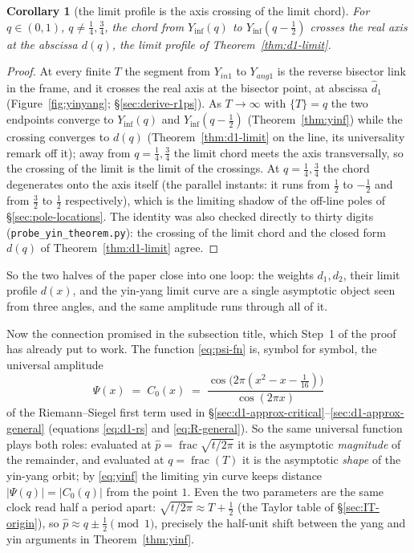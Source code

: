 \documentclass[11pt]{article}
\newtheorem{corollary}[theorem]{Corollary}
\theoremstyle{definition}
\begin{document}
\begin{corollary}[the limit profile is the axis crossing of the limit
chord]\label{cor:yinf-crossing}
For $q\in(0,1)$, $q\neq\tfrac14,\tfrac34$, the chord from
$Y_{\inf}(q)$ to $Y_{\inf}(q-\tfrac12)$ crosses the real axis at the
abscissa $d(q)$, the limit profile of Theorem~\ref{thm:d1-limit}.
\end{corollary}

\begin{proof}
At every finite $T$ the segment from $Y_{in1}$ to $Y_{ang1}$ is the reverse
bisector link in the frame, and it crosses the real axis at the bisector
point, at abscissa $\hat d_1$ (Figure~\ref{fig:yinyang};
\S\ref{sec:derive-r1ps}). As $T\to\infty$ with $\{T\}=q$ the two endpoints
converge to $Y_{\inf}(q)$ and $Y_{\inf}(q-\tfrac12)$
(Theorem~\ref{thm:yinf}) while the crossing converges to $d(q)$
(Theorem~\ref{thm:d1-limit} on the line, its universality remark off it);
away from $q=\tfrac14,\tfrac34$ the limit chord meets the axis
transversally, so the crossing of the limit is the limit of the crossings.
At $q=\tfrac14,\tfrac34$ the chord degenerates onto the axis itself (the
parallel instants: it runs from $\tfrac12$ to $-\tfrac12$ and from
$\tfrac32$ to $\tfrac12$ respectively), which is the limiting shadow of the
off-line poles of \S\ref{sec:pole-locations}. The identity was also checked
directly to thirty digits (\texttt{probe\_yin\_theorem.py}): the crossing
of the limit chord and the closed form $d(q)$ of
Theorem~\ref{thm:d1-limit} agree.
\end{proof}

So the two halves of the paper close into one loop: the weights
$d_1,d_2$, their limit profile $d(x)$, and the yin-yang limit curve are a
single asymptotic object seen from three angles, and the same amplitude
runs through all of it.

Now the connection promised in the subsection title, which Step~1 of the
proof has already put to work. The function
\eqref{eq:psi-fn} is, symbol for symbol, the universal amplitude
\begin{equation}\label{eq:psi-is-c0}
\Psi(x)\;=\;C_0(x)
\;=\;\frac{\cos\!\bigl(2\pi(x^{2}-x-\tfrac{1}{16})\bigr)}{\cos(2\pi x)}
\end{equation}
of the Riemann--Siegel first term used in
\S\ref{sec:d1-approx-critical}--\ref{sec:d1-approx-general}
(equations \eqref{eq:d1-rs} and \eqref{eq:R-general}). So the same universal
function plays both roles: evaluated at $\hat p=\operatorname{frac}\sqrt{t/2\pi}$
it is the asymptotic \emph{magnitude} of the remainder, and evaluated at
$q=\operatorname{frac}(T)$ it is the asymptotic \emph{shape} of the yin-yang
orbit; by \eqref{eq:yinf} the limiting yin curve keeps distance
$|\Psi(q)| = |C_0(q)|$ from the point $1$. Even the two parameters are the
same clock read half a period apart: $\sqrt{t/2\pi}\approx T+\tfrac12$ (the
Taylor table of \S\ref{sec:IT-origin}), so
$\hat p\approx q\pm\tfrac12 \pmod 1$, precisely the half-unit shift between
the yang and yin arguments in Theorem~\ref{thm:yinf}.
\end{document}
